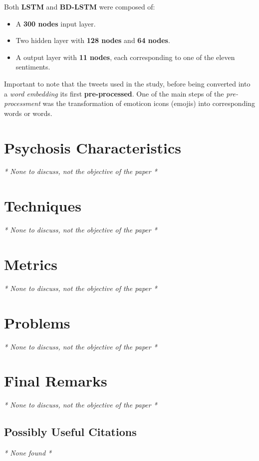 \documentclass{Paper_Summary}
\begin{document}
    Both \textbf{LSTM} and \textbf{BD-LSTM} were composed of:
    \begin{itemize}
        \item A \textbf{300 nodes} input layer.
        \item Two hidden layer with \textbf{128 nodes} and \textbf{64 nodes}.
        \item A output layer with \textbf{11 nodes}, each corresponding to one of the eleven sentiments.
    \end{itemize}

    Important to note that the tweets used in the study, before being converted into a \emph{word embedding} its first \textbf{pre-processed}. One of the main steps of the \emph{pre-processment} was the transformation of emoticon icons (emojis) into corresponding words or words.

\breakline

\newpage

\section{Psychosis Characteristics}
\emph{* None to discuss, not the objective of the paper *}

\section{Techniques}
\emph{* None to discuss, not the objective of the paper *}

\section{Metrics}
\emph{* None to discuss, not the objective of the paper *}

\section{Problems}
\emph{* None to discuss, not the objective of the paper *}


\section{Final Remarks}
\emph{* None to discuss, not the objective of the paper *}

\breakline

\begin{center}
    \section*{Possibly Useful Citations}
\end{center}
\emph{* None found *}
\end{document}
